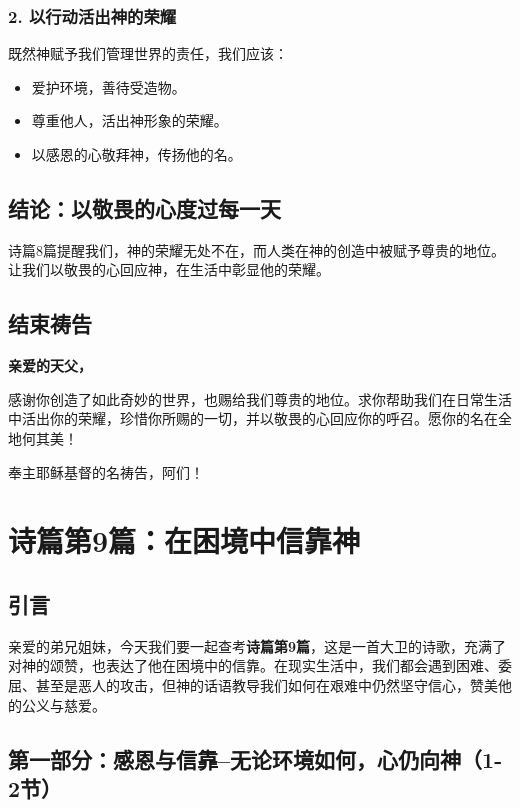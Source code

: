 \documentclass[a4paper, 12pt]{article}
\begin{document}
\subsubsection*{2. 以行动活出神的荣耀}
既然神赋予我们管理世界的责任，我们应该：
\begin{itemize}
    \item 爱护环境，善待受造物。
    \item 尊重他人，活出神形象的荣耀。
    \item 以感恩的心敬拜神，传扬他的名。
\end{itemize}

\subsection*{结论：以敬畏的心度过每一天}

诗篇8篇提醒我们，神的荣耀无处不在，而人类在神的创造中被赋予尊贵的地位。让我们以敬畏的心回应神，在生活中彰显他的荣耀。

\subsection*{结束祷告}

\textbf{亲爱的天父，}

感谢你创造了如此奇妙的世界，也赐给我们尊贵的地位。求你帮助我们在日常生活中活出你的荣耀，珍惜你所赐的一切，并以敬畏的心回应你的呼召。愿你的名在全地何其美！

奉主耶稣基督的名祷告，阿们！

\newpage
\section{诗篇第9篇：在困境中信靠神}
\subsection*{引言}

亲爱的弟兄姐妹，今天我们要一起查考\textbf{诗篇第9篇}，这是一首大卫的诗歌，充满了对神的颂赞，也表达了他在困境中的信靠。在现实生活中，我们都会遇到困难、委屈、甚至是恶人的攻击，但神的话语教导我们如何在艰难中仍然坚守信心，赞美他的公义与慈爱。



\subsection*{第一部分：感恩与信靠--无论环境如何，心仍向神（1-2节）}
\end{document}
